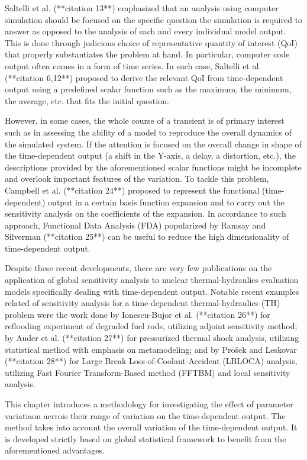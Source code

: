 Saltelli et al. (**citation 13**) emphasized that an analysis using computer simulation 
should be focused on the specific question the simulation is required to answer 
as opposed to the analysis of each and every individual model output. 
This is done through judicious choice of representative quantity of interest (QoI) 
that properly substantiates the problem at hand. 
In particular, computer code output often comes in a form of time series. 
In such case, Saltelli et al. (**citation 6,12**) proposed to derive the relevant QoI from time-dependent output 
using a predefined scalar function such as the maximum, the minimum, the average, etc. that fits the initial question.

However, in some cases, the whole course of a transient is of primary interest 
such as in assessing the ability of a model to reproduce the overall dynamics of the simulated system. 
If the attention is focused on the overall change in shape of the time-dependent output (a shift in the Y-axis, a delay, a distortion, etc.), 
the descriptions provided by the aforementioned scalar functions might be incomplete and overlook important features of the variation. 
To tackle this problem, Campbell et al. (**citation 24**) proposed to represent the functional (time-dependent) output in a certain basis function expansion 
and to carry out the sensitivity analysis on the coefficients of the expansion. 
In accordance to such approach, Functional Data Analysis (FDA) popularized by Ramsay and Silverman (**citation 25**) 
can be useful to reduce the high dimensionality of time-dependent output.

Despite these recent developments, 
there are very few publications on the application of global sensitivity analysis to nuclear thermal-hydraulics evaluation models specifically dealing with time-dependent output.
Notable recent examples related of sensitivity analysis for a time-dependent thermal-hydraulics (TH) problem were the work done by Ionescu-Bujor et al. (**citation 26**) 
for reflooding experiment of degraded fuel rods, utilizing adjoint sensitivity method; 
by Auder et al. (**citation 27**) for pressurized thermal shock analysis, 
utilizing statistical method with emphasis on metamodeling; 
and by Prošek and Leskovar (**citation 28**) for Large Break Loss-of-Coolant-Accident (LBLOCA) analysis, 
utilizing Fast Fourier Transform-Based method (FFTBM) and local sensitivity analysis.

This chapter introduces a methodology for investigating the effect of parameter variatiaon acrrois their range of variation on the time-dependent output.
The method takes into account the overall variation of the time-dependent output. 
It is developed strictly based on global statistical framework to benefit from the aforementioned advantages.

